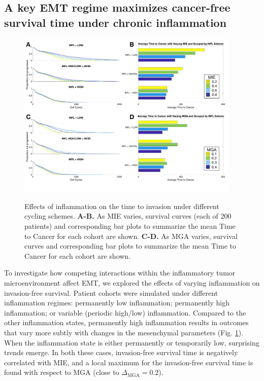 \documentclass[11pt]{article}
\begin{document}
\subsection{A key EMT regime maximizes cancer-free survival time under chronic inflammation}\label{KeyEMT}

\begin{figure}
\center
{\includegraphics[width=0.95\textwidth]{Figure4/Figure4.pdf}}
\caption{Effects of inflammation on the time to invasion under different cycling schemes. {\bf A-B.} As MIE varies, survival curves (each of 200 patients)  and corresponding bar plots to summarize the mean Time to Cancer for each cohort are shown. {\bf C-D.} As MGA varies, survival curves  and corresponding bar plots to summarize the mean Time to Cancer for each cohort are shown.}
\label{fig:VaryINFL_and_MesPars}
\end{figure}


To investigate how competing interactions within the inflammatory tumor microenvironment affect EMT, we explored the effects of varying inflammation on invasion-free survival. Patient cohorts were simulated under different inflammation regimes: permanently low inflammation; permanently high inflammation; or variable (periodic high/low) inflammation. 
Compared to the other inflammation states, permanently high inflammation results in outcomes that vary more subtly with changes in the mesenchymal parameters (Fig. \ref{fig:VaryINFL_and_MesPars}).
When the inflammation state is either permanently or temporarily low, surprising trends emerge. In both these cases, invasion-free survival time is negatively correlated with MIE, and a local maximum for the invasion-free survival time is found with respect to MGA (close to $\Delta_\text{MGA}= 0.2$).
\end{document}
